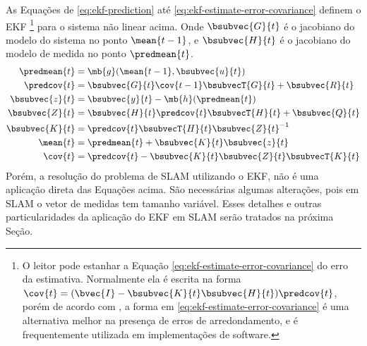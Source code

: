 As Equações de \ref{eq:ekf-prediction} até \ref{eq:ekf-estimate-error-covariance} definem o EKF \footnote{O leitor pode estanhar a Equação \ref{eq:ekf-estimate-error-covariance} do erro da estimativa. Normalmente ela é escrita na forma $\cov{t} = (\bvec{I} - \bsubvec{K}{t} \bsubvec{H}{t}) \predcov{t}$, porém de acordo com \cite[p.~ 73]{lewis2017optimal}, a forma em \ref{eq:ekf-estimate-error-covariance} é uma alternativa melhor na presença de erros de arredondamento, e é frequentemente utilizada em implementações de software.} para o sistema não linear acima. Onde $\bsubvec{G}{t}$ é o jacobiano do modelo do sistema no ponto $\mean{t-1}$, e $\bsubvec{H}{t}$ é o jacobiano do modelo de medida no ponto $\predmean{t}$.
\begin{align}
  \predmean{t} &= \mb{g}(\mean{t-1}, \bsubvec{u}{t})
  \label{eq:ekf-prediction}\\
  \predcov{t} &= \bsubvec{G}{t}\cov{t-1}\bsubvecT{G}{t} + \bsubvec{R}{t}
  \label{eq:ekf-prediction-error-covariance}\\
  \bsubvec{z}{t} &= \bsubvec{y}{t} - \mb{h}(\predmean{t})
  \label{eq:ekf-inovation} \\
  \bsubvec{Z}{t} &= \bsubvec{H}{t}\predcov{t}\bsubvecT{H}{t} + \bsubvec{Q}{t}
  \label{eq:ekf-inovation-covariance} \\
  \bsubvec{K}{t} &=   \predcov{t}\bsubvecT{H}{t} \bsubvec{Z}{t}^{-1}
  \label{eq:ekf-gain}\\
  \mean{t} &= \predmean{t} + \bsubvec{K}{t} \bsubvec{z}{t}
  \label{eq:ekf-update}\\
  \cov{t} &= \predcov{t} - \bsubvec{K}{t}\bsubvec{Z}{t}\bsubvecT{K}{t}
  \label{eq:ekf-estimate-error-covariance}
\end{align}
Porém, a resolução do problema de SLAM utilizando o EKF, não é uma aplicação 
direta das Equações acima. São necessárias algumas alterações, pois em SLAM o vetor de medidas tem tamanho variável. Esses detalhes e outras particularidades da aplicação do EKF em SLAM serão tratados na próxima Seção.

